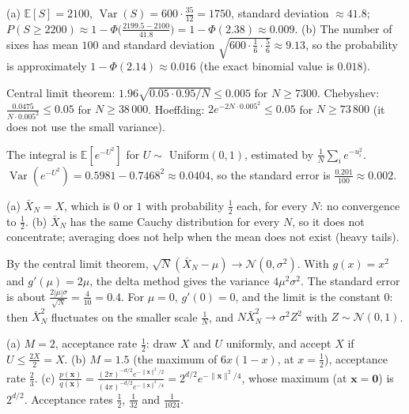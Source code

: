 \documentclass[11pt]{article}
\newcommand{\norm}[1]{\lVert #1 \rVert}
\newcommand{\E}{\mathbb{E}}
\DeclareMathOperator{\Var}{Var}
\begin{document}
\begin{description}[leftmargin=0pt, itemsep=0.3em]
    \item[\ref{pr:clt-dice}.] (a) $\E[S] = 2100$, $\Var(S) = 600 \cdot \frac{35}{12} = 1750$, standard deviation $\approx 41.8$; $P(S \geq 2200) \approx 1 - \Phi\big(\frac{2199.5 - 2100}{41.8}\big) = 1 - \Phi(2.38) \approx 0.009$. (b) The number of sixes has mean $100$ and standard deviation $\sqrt{600 \cdot \frac{1}{6} \cdot \frac{5}{6}} \approx 9.13$, so the probability is approximately $1 - \Phi(2.14) \approx 0.016$ (the exact binomial value is $0.018$).
    \item[\ref{pr:sample-size}.] Central limit theorem: $1.96\sqrt{0.05 \cdot 0.95/N} \leq 0.005$ for $N \geq 7300$. Chebyshev: $\frac{0.0475}{N \cdot 0.005^2} \leq 0.05$ for $N \geq 38\,000$. Hoeffding: $2e^{-2N \cdot 0.005^2} \leq 0.05$ for $N \geq 73\,800$ (it does not use the small variance).
    \item[\ref{pr:monte-carlo-integral}.] The integral is $\E[e^{-U^2}]$ for $U \sim$ Uniform$(0, 1)$, estimated by $\frac{1}{N}\sum_i e^{-u_i^2}$. $\Var(e^{-U^2}) = 0.5981 - 0.7468^2 \approx 0.0404$, so the standard error is $\frac{0.201}{100} \approx 0.002$.
    \item[\ref{pr:lln-fails}.] (a) $\bar X_N = X$, which is $0$ or $1$ with probability $\frac{1}{2}$ each, for every $N$: no convergence to $\frac{1}{2}$. (b) $\bar X_N$ has the same Cauchy distribution for every $N$, so it does not concentrate; averaging does not help when the mean does not exist (heavy tails).
    \item[\ref{pr:delta-method}.] By the central limit theorem, $\sqrt{N}(\bar X_N - \mu) \to \mathcal{N}(0, \sigma^2)$. With $g(x) = x^2$ and $g'(\mu) = 2\mu$, the delta method gives the variance $4\mu^2\sigma^2$. The standard error is about $\frac{2|\mu|\sigma}{\sqrt{N}} = \frac{4}{10} = 0.4$. For $\mu = 0$, $g'(0) = 0$, and the limit is the constant $0$: then $\bar X_N^2$ fluctuates on the smaller scale $\frac{1}{N}$, and $N\bar X_N^2 \to \sigma^2 Z^2$ with $Z \sim \mathcal{N}(0, 1)$.
    \item[\ref{pr:rejection}.] (a) $M = 2$, acceptance rate $\frac{1}{2}$: draw $X$ and $U$ uniformly, and accept $X$ if $U \leq \frac{2X}{2} = X$. (b) $M = 1.5$ (the maximum of $6x(1 - x)$, at $x = \frac{1}{2}$), acceptance rate $\frac{2}{3}$. (c) $\frac{p(\mathbf{x})}{q(\mathbf{x})} = \frac{(2\pi)^{-d/2}e^{-\norm{\mathbf{x}}^2/2}}{(4\pi)^{-d/2}e^{-\norm{\mathbf{x}}^2/4}} = 2^{d/2}e^{-\norm{\mathbf{x}}^2/4}$, whose maximum (at $\mathbf{x} = \mathbf{0}$) is $2^{d/2}$. Acceptance rates $\frac{1}{2}$, $\frac{1}{32}$ and $\frac{1}{1024}$.

\end{description}
\end{document}
